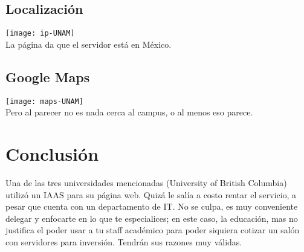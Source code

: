 \subsection{Localización}
\texttt{[image: ip-UNAM]}\\
La página da que el servidor está en México.
\subsection{Google Maps}
\texttt{[image: maps-UNAM]}\\
Pero al parecer no es nada cerca al campus,
o al menos eso parece.
	
	\section{Conclusión}
	Una de las tres universidades mencionadas (University of British Columbia) utilizó un 
	IAAS para su página web. Quizá le salía a
	costo rentar el servicio, a pesar que
	cuenta con un departamento de IT.
	No se culpa, es muy conveniente
	delegar y enfocarte en lo que te especialices;
	en este caso, la educación, mas no justifica
	el poder usar a tu staff académico para poder
	siquiera cotizar un salón con servidores para
	inversión. Tendrán sus razones muy válidas.
	
	
